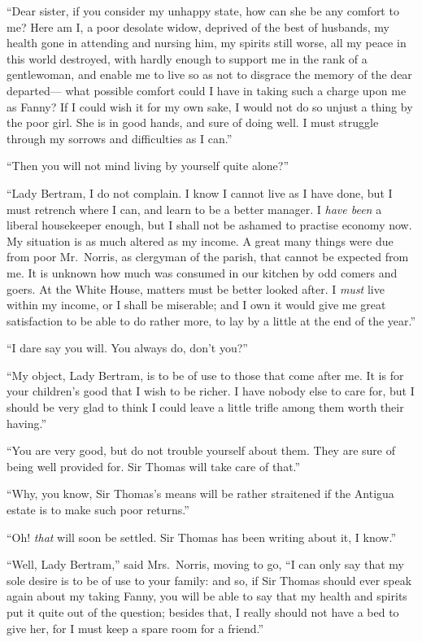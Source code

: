 \documentclass{article}
\begin{document}
``Dear sister, if you consider my unhappy state, how can she
be any comfort to me?  Here am I, a poor desolate widow,
deprived of the best of husbands, my health gone in attending
and nursing him, my spirits still worse, all my peace
in this world destroyed, with hardly enough to support
me in the rank of a gentlewoman, and enable me to live
so as not to disgrace the memory of the dear departed---%
what possible comfort could I have in taking such a charge
upon me as Fanny?  If I could wish it for my own sake,
I would not do so unjust a thing by the poor girl.
She is in good hands, and sure of doing well.  I must
struggle through my sorrows and difficulties as I can.''

``Then you will not mind living by yourself quite alone?''

``Lady Bertram, I do not complain.  I know I cannot
live as I have done, but I must retrench where I can,
and learn to be a better manager.  I \emph{have been}
a liberal housekeeper enough, but I shall not be ashamed
to practise economy now.  My situation is as much
altered as my income.  A great many things were due
from poor Mr.\ Norris, as clergyman of the parish,
that cannot be expected from me.  It is unknown how much
was consumed in our kitchen by odd comers and goers.
At the White House, matters must be better looked after.
I \emph{must} live within my income, or I shall be miserable;
and I own it would give me great satisfaction to be able
to do rather more, to lay by a little at the end of
the year.''

``I dare say you will.  You always do, don't you?''

``My object, Lady Bertram, is to be of use to those that
come after me.  It is for your children's good that I
wish to be richer.  I have nobody else to care for,
but I should be very glad to think I could leave a little
trifle among them worth their having.''

``You are very good, but do not trouble yourself about them.
They are sure of being well provided for.  Sir Thomas
will take care of that.''

``Why, you know, Sir Thomas's means will be rather straitened
if the Antigua estate is to make such poor returns.''

``Oh! \emph{that} will soon be settled.  Sir Thomas has been
writing about it, I know.''

``Well, Lady Bertram,'' said Mrs.\ Norris, moving to go,
``I can only say that my sole desire is to be of use
to your family:  and so, if Sir Thomas should ever speak
again about my taking Fanny, you will be able to say that
my health and spirits put it quite out of the question;
besides that, I really should not have a bed to give her,
for I must keep a spare room for a friend.''
\end{document}
